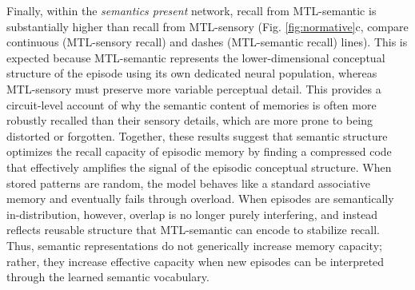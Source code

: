 \documentclass{article}
\begin{document}
\newline\newline
Finally, within the \textit{semantics present} network, recall from MTL-semantic is substantially higher than recall from MTL-sensory (Fig. \ref{fig:normative}c, compare continuous (MTL-sensory recall) and dashes (MTL-semantic recall) lines). This is expected because MTL-semantic represents the lower-dimensional conceptual structure of the episode using its own dedicated neural population, whereas MTL-sensory must preserve more variable perceptual detail. This provides a circuit-level account of why the semantic content of memories is often more robustly recalled than their sensory details, which are more prone to being distorted or forgotten.
\newline\newline
Together, these results suggest that semantic structure optimizes the recall capacity of episodic memory by finding a compressed code that effectively amplifies the signal of the episodic conceptual structure. When stored patterns are random, the model behaves like a standard associative memory and eventually fails through overload. When episodes are semantically in-distribution, however, overlap is no longer purely interfering, and instead reflects reusable structure that MTL-semantic can encode to stabilize recall. Thus, semantic representations do not generically increase memory capacity; rather, they increase effective capacity when new episodes can be interpreted through the learned semantic vocabulary.
\end{document}
